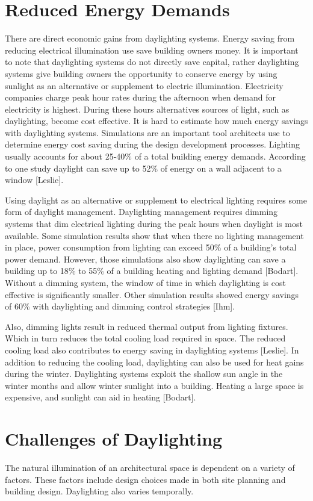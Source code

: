 \section{Reduced Energy Demands}
There are direct economic gains from daylighting systems. Energy saving from reducing electrical illumination use save building owners money.
It is important to note that daylighting systems do not directly save capital, rather daylighting systems give building owners the opportunity to conserve energy by using sunlight as an alternative or supplement to electric illumination. Electricity companies charge peak hour rates during the afternoon when demand for electricity is highest. During these hours alternatives sources of light, such as daylighting, become cost effective.
It is hard to estimate how much energy savings with daylighting systems. Simulations are an important tool architects use to determine energy cost saving during the design development processes.  Lighting usually accounts for about 25-40\% of a total building energy demands.
According to one study daylight can save up to 52\% of energy on a wall adjacent to a window [Leslie].

Using daylight as an alternative or supplement to electrical lighting requires some form of daylight management. Daylighting management requires dimming systems that dim electrical lighting during the peak hours when daylight is most available.  Some simulation results show that when there no lighting management in place,  power consumption from lighting can exceed 50\% of a building's total power demand.
However, those simulations also show daylighting can save a building up to 18\% to 55\% of a building heating and lighting demand [Bodart].
Without a dimming system, the window of time in which daylighting is cost effective is significantly smaller. Other simulation results showed energy savings of 60\% with daylighting and dimming control strategies [Ihm].

Also, dimming lights result in reduced thermal output from lighting fixtures. Which in turn reduces the total cooling load required in space. The reduced cooling load also contributes to energy saving in daylighting systems [Leslie].  In addition to reducing the cooling load, daylighting can also be used for heat gains during the winter. Daylighting systems exploit the shallow sun angle in the winter months and allow winter sunlight into a building. Heating a large space is expensive, and sunlight can aid in heating [Bodart].

\section{Challenges of Daylighting}
The natural illumination of an architectural space is dependent on a variety of factors. These factors include design choices made in both site planning and building design. Daylighting also varies temporally.

